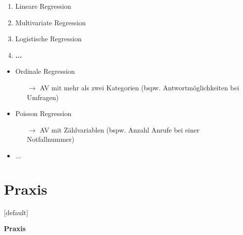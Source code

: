\documentclass[aspectratio=169, journal, x11names, unknownkeysallowed, hyperref={colorlinks,
linkcolor = SS2,
urlcolor  = F3,
citecolor = F3,
anchorcolor = A4}, 12pt]{beamer}
\newcommand{\oarrow}{\textcolor{A1}{$\rightarrow$} }
\begin{document}
    \begin{frame}[t]
      \begin{minipage}[t]{0.45\textwidth}
        \begin{enumerate}
          \item Lineare Regression
          \item Multivariate Regression
          \item Logistische Regression
          \item \textbf{...}
        \end{enumerate}
    \end{minipage}%
    \begin{minipage}[t]{0.45\textwidth}
      \begin{itemize}
        \item Ordinale Regression
        \begin{itemize}
          \item[\oarrow] AV mit mehr als zwei Kategorien (bspw. Antwortmöglichkeiten bei Umfragen)
        \end{itemize}
        \item Poisson Regression
        \begin{itemize}
          \item[\oarrow] AV mit Zählvariablen (bspw. Anzahl Anrufe bei einer Notfallnummer)
        \end{itemize}
        \item ...
      \end{itemize}
    \end{minipage}
    \end{frame}
  
\section{Praxis}
[default]
\thispagestyle{empty}
\begin{frame} 
\begin{center}
\textcolor{SS2}{\huge{\textbf{Praxis}}}
\end{center}
\end{frame}

\end{document}
